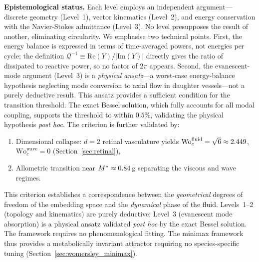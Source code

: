 \textbf{Epistemological status.} Each level employs an independent
argument---discrete geometry (Level~1), vector kinematics (Level~2), and energy
conservation with the Navier-Stokes admittance (Level~3). No level presupposes
the result of another, eliminating circularity. We emphasise two technical
points. First, the energy balance is expressed in terms of time-averaged powers,
not energies per cycle; the definition $\mathcal{Q}^{-1} \equiv
\mathrm{Re}(Y)/|\mathrm{Im}(Y)|$ directly gives the ratio of dissipated to
reactive power, so no factor of $2\pi$ appears. Second, the evanescent-mode
argument (Level~3) is a \emph{physical ansatz}---a worst-case energy-balance
hypothesis neglecting mode conversion to axial flow in daughter vessels---not a
purely deductive result. This ansatz provides a sufficient condition for
the transition threshold. The exact Bessel solution, which fully accounts for
all modal coupling, supports the threshold to within $0.5\%$, validating
the physical hypothesis \emph{post hoc}. The criterion is further validated by:
\begin{enumerate}[label=(\roman*)]
    \item
Dimensional collapse: $d=2$ retinal vasculature yields
$\mathrm{Wo}_c^{\mathrm{fluid}} = \sqrt{6} \approx 2.449$,
$\mathrm{Wo}_c^{\mathrm{wave}} = 0$ (Section~\ref{sec:retinal}),
    \item
Allometric transition near $M^* \approx 0.84\,$g separating the viscous and
wave regimes.
\end{enumerate}

This criterion establishes a correspondence between the \emph{geometrical}
degrees of freedom of the embedding space and the \emph{dynamical} phase of the
fluid. Levels~1--2 (topology and kinematics) are purely deductive; Level~3
(evanescent mode absorption) is a physical ansatz validated \emph{post hoc} by
the exact Bessel solution. The framework requires no phenomenological fitting.
The minimax framework thus provides a metabolically invariant attractor
requiring no species-specific tuning (Section~\ref{sec:womersley_minimax}).
